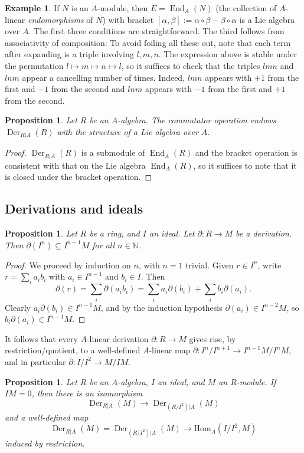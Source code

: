 \documentclass{amsart}[12pt]
\def\Der{\operatorname{Der}}
\def\End{\operatorname{End}}
\newcommand{\Hom}{\mathrm{Hom}}
\newcommand{\N}{\mathbb{N}}
\numberwithin{equation}{section}
\theoremstyle{plain} %
\newtheorem{prop}[equation]{Proposition}
\theoremstyle{definition}
\newtheorem{ex}[equation]{Example}
\theoremstyle{remark}
\newcommand{\ssec}[1]{\subsection{#1}}
\begin{document}
\begin{ex} If $N$ is an $A$-module, then $E=\End_A(N)$ (the collection of $A$-linear \emph{endomorphisms}\index{$\End_A(N)$} of $N$) with bracket $[\alpha,\beta]:= \alpha\circ \beta - \beta\circ \alpha$ is a Lie algebra over $A$. 
The first three conditions are straightforward. The third follows from associativity of composition: To avoid foiling all these out, note that each term after expanding is a triple involving $l,m,n$. The expression above is stable under the permutation $l\mapsto m\mapsto n\mapsto l$, so it suffices to check that the triples $lmn$ and $lnm$ appear a cancelling number of times. Indeed, $lmn$ appears with $+1$ from the first and $-1$ from the second and $lnm$ appears with $-1$ from the first and $+1$ from the second.
\end{ex}


\begin{prop} Let $R$ be an $A$-algebra. The commutator operation endows $\Der_{R|A}(R)$ with the structure of a Lie algebra over $A$.
\end{prop}
\begin{proof}
$\Der_{R|A}(R)$ is a submodule of $\End_A(R)$ and the bracket operation is consistent with that on the Lie algebra $\End_A(R)$, so it suffices to note that it is closed under the bracket operation.
\end{proof}

\ssec{Derivations and ideals}

\begin{prop} Let $R$ be a ring, and $I$ an ideal. Let $\partial:R\to M$ be a derivation. Then $\partial(I^n) \subseteq I^{n-1}M$ for all $n\in \N$.
\end{prop}
\begin{proof}
We proceed by induction on $n$, with $n=1$ trivial. Given $r\in I^n$, write $r=\sum_i a_i b_i$ with $a_i\in I^{n-1}$ and $b_i\in I$. Then \[\partial(r) = \sum_i \partial(a_i b_i) = \sum_i a_i \partial(b_i) + \sum_i b_i \partial(a_i).\]
Clearly $a_i \partial(b_i)\in I^{n-1} M$, and by the induction hypothesis $\partial(a_i)\in I^{n-2}M$, so $b_i \partial(a_i)\in I^{n-1}M$.
\end{proof}

It follows that every $A$-linear derivation $\partial: R\to M$ gives rise, by restriction/quotient, to a well-defined $A$-linear map $\overline{\partial}: I^n/I^{n+1} \to I^{n-1}M / I^{n}M$, and in particular $\overline{\partial}: I/I^2 \to M / IM$. 

\begin{prop}
Let $R$ be an $A$-algebra, $I$ an ideal, and $M$ an $R$-module. If $IM=0$, then
there is an isomorphism
\[ \Der_{R|A}(M) \to \Der_{(R/I^2)|A}(M)\]
and a well-defined map
\[ \Der_{R|A}(M) = \Der_{(R/I^2)|A}(M) \to \Hom_A(I/I^2,M)\]
induced by restriction.
\end{prop}
\end{document}
